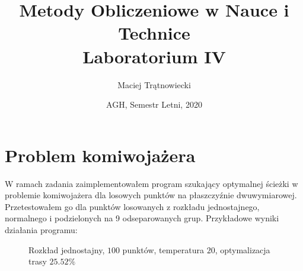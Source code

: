 \documentclass{article}
\title{Metody Obliczeniowe w Nauce i Technice\\ 
Laboratorium IV}
\author{Maciej Trątnowiecki}
\date{AGH, Semestr Letni, 2020}
\begin{document}
    \maketitle
    \section{Problem komiwojażera}
        W ramach zadania zaimplementowałem program szukający optymalnej ścieżki w problemie komiwojażera dla losowych punktów na płaszczyźnie dwuwymiarowej. Przetestowałem go dla punktów losowanych z rozkładu jednostajnego, normalnego i podzielonych na 9 odseparowanych grup. 
        Przykładowe wyniki działania programu:
        \begin{figure}[h!]
            \centering
            \caption{Rozkład jednostajny, $100$ punktów, temperatura $20$, optymalizacja trasy $25.52\%$}
        \end{figure}\\
\end{document}

